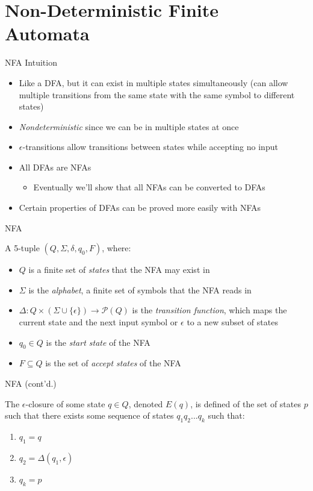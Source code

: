 \documentclass{beamer}
\begin{document}
\section{Non-Deterministic Finite Automata}

\begin{frame}{NFA Intuition}
\begin{itemize}
	\item Like a DFA, but it can exist in multiple states simultaneously (can allow multiple transitions from the same state with the same symbol to different states)
    \item \textit{Nondeterministic} since we can be in multiple states at once
    \item $\epsilon$-transitions allow transitions between states while accepting no input
    \item All DFAs are NFAs
    \begin{itemize}
    	\item Eventually we'll show that all NFAs can be converted to DFAs
    \end{itemize}
    \item Certain properties of DFAs can be proved more easily with NFAs
\end{itemize}
\end{frame}

\begin{frame}{NFA}
\begin{definition}
A 5-tuple $(Q, \Sigma, \delta, q_0, F)$, where:
\begin{itemize}
\item $Q$ is a finite set of \textit{states} that the NFA may exist in
\item $\Sigma$ is the \textit{alphabet}, a finite set of symbols that the NFA reads in
\item $\Delta: Q \times (\Sigma \cup \{\epsilon\}) \to \mathcal{P}(Q)$ is the \textit{transition function}, which maps the current state and the next input symbol or $\epsilon$ to a new subset of states
\item $q_0 \in Q$ is the \textit{start state} of the NFA
\item $F \subseteq Q$ is the set of \textit{accept states} of the NFA
\end{itemize}
\end{definition}
\end{frame}

\begin{frame}{NFA (cont'd.)}
\begin{definition}
The $\epsilon$-closure of some state $q \in Q$, denoted $E(q)$, is defined of the set of states $p$ such that there exists some sequence of states $q_1 q_2 ... q_k$ such that:

\begin{enumerate}
\item $q_1 = q$
\item $q_2 = \Delta(q_1, \epsilon)$
\item $q_k = p$	
\end{enumerate}
\end{definition}
\end{frame}
\end{document}
